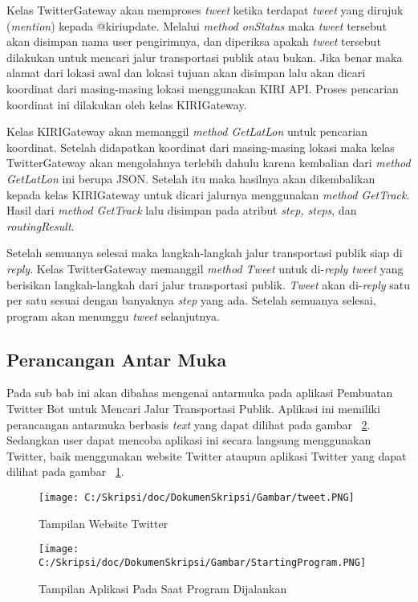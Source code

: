 Kelas TwitterGateway akan memproses \textit{tweet} ketika terdapat \textit{tweet} yang dirujuk (\textit{mention}) kepada @kiriupdate. Melalui \textit{method onStatus} maka \textit{tweet} tersebut akan disimpan nama user pengirimnya, dan diperiksa apakah \textit{tweet} tersebut dilakukan untuk mencari jalur transportasi publik atau bukan. Jika benar maka alamat dari lokasi awal dan lokasi tujuan akan disimpan lalu akan dicari koordinat dari masing-masing lokasi menggunakan KIRI API. Proses pencarian koordinat ini dilakukan oleh kelas KIRIGateway.

Kelas KIRIGateway akan memanggil \textit{method GetLatLon} untuk pencarian koordinat. Setelah didapatkan koordinat dari masing-masing lokasi maka kelas TwitterGateway akan mengolahnya terlebih dahulu karena kembalian dari \textit{method GetLatLon} ini berupa JSON. Setelah itu maka hasilnya akan dikembalikan kepada kelas KIRIGateway untuk dicari jalurnya menggunakan \textit{method GetTrack}. Hasil dari \textit{method GetTrack} lalu disimpan pada atribut \textit{step, steps}, dan \textit{routingResult}.

Setelah semuanya selesai maka langkah-langkah jalur transportasi publik siap di \textit{reply}. Kelas TwitterGateway memanggil \textit{method Tweet} untuk di-\textit{reply tweet} yang berisikan langkah-langkah dari jalur transportasi publik. \textit{Tweet} akan di-\textit{reply} satu per satu sesuai dengan banyaknya \textit{step} yang ada. Setelah semuanya selesai, program akan menunggu \textit{tweet} selanjutnya.

\subsection{Perancangan Antar Muka}

Pada sub bab ini akan dibahas mengenai antarmuka pada aplikasi Pembuatan Twitter Bot untuk Mencari Jalur Transportasi Publik. Aplikasi ini memiliki perancangan antarmuka berbasis \textit{text} yang dapat dilihat pada gambar ~\ref{fig:StartingProgram}. Sedangkan user dapat mencoba aplikasi ini secara langsung menggunakan Twitter, baik menggunakan website Twitter ataupun aplikasi Twitter yang dapat dilihat pada gambar ~\ref{fig:tweet}.

\begin{figure}[htbp]
	\centering
		\texttt{[image: C:/Skripsi/doc/DokumenSkripsi/Gambar/tweet.PNG]}
	\caption{Tampilan Website Twitter}
	\label{fig:tweet}
\end{figure}

\begin{figure}
	\centering
		\texttt{[image: C:/Skripsi/doc/DokumenSkripsi/Gambar/StartingProgram.PNG]}
	\caption{Tampilan Aplikasi Pada Saat Program Dijalankan}
	\label{fig:StartingProgram}
\end{figure}


